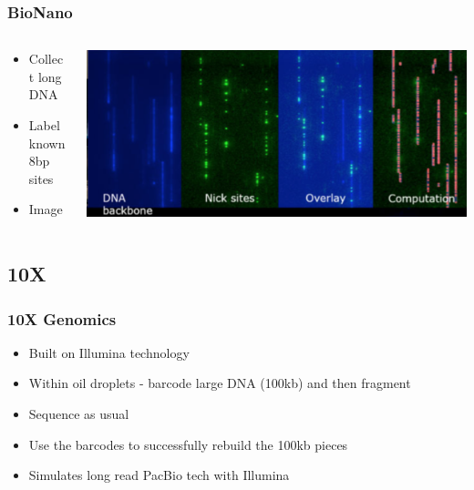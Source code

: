 \documentclass[14pt,handout]{beamer}
\begin{document}
\begin{frame}
\frametitle{BioNano}
\begin{columns}
	\begin{column}{0.3\textwidth}
		\begin{itemize}
			\item<+-> Collect long DNA
			\item<+-> Label known 8bp sites
			\item<+-> Image
		\end{itemize}
		\end{column}
	\begin{column}{0.7\textwidth}
		\begin{center}
     		\includegraphics[width=1\textwidth]{images_20171024_bionano.png}
     	\end{center}
	\end{column}
\end{columns}
\end{frame}


\subsection{10X}

\begin{frame}
\frametitle{10X Genomics}
\begin{itemize}
	\item<+-> Built on Illumina technology
	\item<+-> Within oil droplets - barcode large DNA (100kb) and then fragment
	\item<+-> Sequence as usual
	\item<+-> Use the barcodes to successfully rebuild the 100kb pieces
	\item<+-> Simulates long read PacBio tech with Illumina
\end{itemize}
\end{frame}
\end{document}
